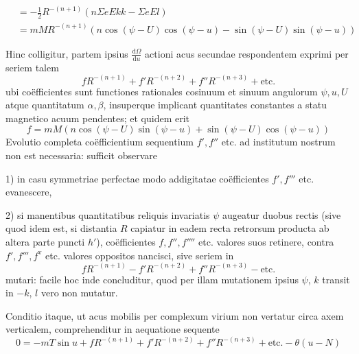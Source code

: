 \[
\begin{aligned}
&=-\tfrac12 R^{-(n+1)}(n\Sigma eEkk-\Sigma eEl)\\
&=mMR^{-(n+1)}(n\cos(\psi-U)\cos(\psi-u)-\sin(\psi-U)\sin(\psi-u))
\end{aligned}
\]

Hinc colligitur, partem ipsius $\frac{\mathrm{d}\Omega}{\mathrm{d}u}$ actioni acus secundae respondentem exprimi per seriem talem
\[
fR^{-(n+1)}+f'R^{-(n+2)}+f''R^{-(n+3)}+\text{etc.}
\]
ubi coëfficientes sunt functiones rationales cosinuum et sinuum angulorum $\psi,u,U$ atque quantitatum $\alpha,\beta$, insuperque implicant quantitates constantes a statu magnetico acuum pendentes; et quidem erit
\[
f=mM(n\cos(\psi-U)\sin(\psi-u)+\sin(\psi-U)\cos(\psi-u))
\]
Evolutio completa coëfficientium sequentium $f',f''$ etc. ad institutum nostrum non est necessaria: sufficit observare

1) in casu symmetriae perfectae modo addigitatae coëfficientes $f',f'''$ etc. evanescere,

2) si manentibus quantitatibus reliquis invariatis $\psi$ augeatur duobus rectis (sive quod idem est, si distantia $R$ capiatur in eadem recta retrorsum producta ab altera parte puncti $h'$), coëfficientes $f,f'',f''''$ etc. valores suos retinere, contra $f',f''',f^{\mathrm{v}}$ etc. valores oppositos nancisci, sive seriem in
\[
fR^{-(n+1)}-f'R^{-(n+2)}+f''R^{-(n+3)}-\text{etc.}
\]
mutari: facile hoc inde concluditur, quod per illam mutationem ipsius $\psi$, $k$ transit in $-k$, $l$ vero non mutatur.

Conditio itaque, ut acus mobilis per complexum virium non vertatur circa axem verticalem, comprehenditur in aequatione sequente
\[
0=-mT\sin u+fR^{-(n+1)}+f'R^{-(n+2)}+f''R^{-(n+3)}+\text{etc.}-\theta(u-N)
\]

